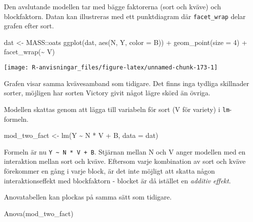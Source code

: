 \documentclass[
]{book}
\newenvironment{Shaded}{\begin{snugshade}}{\end{snugshade}}
\newcommand{\AttributeTok}[1]{\textcolor[rgb]{0.77,0.63,0.00}{#1}}
\newcommand{\DecValTok}[1]{\textcolor[rgb]{0.00,0.00,0.81}{#1}}
\newcommand{\FunctionTok}[1]{\textcolor[rgb]{0.00,0.00,0.00}{#1}}
\newcommand{\NormalTok}[1]{#1}
\newcommand{\OtherTok}[1]{\textcolor[rgb]{0.56,0.35,0.01}{#1}}
\newcommand{\SpecialCharTok}[1]{\textcolor[rgb]{0.00,0.00,0.00}{#1}}
\theoremstyle{definition}
\theoremstyle{definition}
\theoremstyle{definition}
\theoremstyle{definition}
\theoremstyle{remark}
\begin{document}
Den avslutande modellen tar med bägge faktorerna (sort och kväve) och blockfaktorn. Datan kan illustreras med ett punktdiagram där \texttt{facet\_wrap} delar grafen efter sort.

\begin{Shaded}
\begin{Highlighting}[]
\NormalTok{dat }\OtherTok{\textless{}{-}}\NormalTok{ MASS}\SpecialCharTok{::}\NormalTok{oats}
\FunctionTok{ggplot}\NormalTok{(dat, }\FunctionTok{aes}\NormalTok{(N, Y, }\AttributeTok{color =}\NormalTok{ B)) }\SpecialCharTok{+}
  \FunctionTok{geom\_point}\NormalTok{(}\AttributeTok{size =} \DecValTok{4}\NormalTok{) }\SpecialCharTok{+}
  \FunctionTok{facet\_wrap}\NormalTok{(}\SpecialCharTok{\textasciitilde{}}\NormalTok{ V)}
\end{Highlighting}
\end{Shaded}

\begin{center}\texttt{[image: R-anvisningar\_files/figure-latex/unnamed-chunk-173-1]} \end{center}

Grafen visar samma kvävesamband som tidigare. Det finns inga tydliga skillnader sorter, möjligen har sorten Victory givit något lägre skörd än övriga.

Modellen skattas genom att lägga till variabeln för sort (V för variety) i \texttt{lm}-formeln.

\begin{Shaded}
\begin{Highlighting}[]
\NormalTok{mod\_two\_fact }\OtherTok{\textless{}{-}} \FunctionTok{lm}\NormalTok{(Y }\SpecialCharTok{\textasciitilde{}}\NormalTok{ N }\SpecialCharTok{*}\NormalTok{ V }\SpecialCharTok{+}\NormalTok{ B, }\AttributeTok{data =}\NormalTok{ dat)}
\end{Highlighting}
\end{Shaded}

Formeln är nu \texttt{Y\ \textasciitilde{}\ N\ *\ V\ +\ B}. Stjärnan mellan N och V anger modellen med en interaktion mellan sort och kväve. Eftersom varje kombination av sort och kväve förekommer en gång i varje block, är det inte möjligt att skatta någon interaktionseffekt med blockfaktorn - blocket är då istället en \emph{additiv effekt}.

Anovatabellen kan plockas på samma sätt som tidigare.

\begin{Shaded}
\begin{Highlighting}[]
\FunctionTok{Anova}\NormalTok{(mod\_two\_fact)}
\end{Highlighting}
\end{Shaded}
\end{document}
